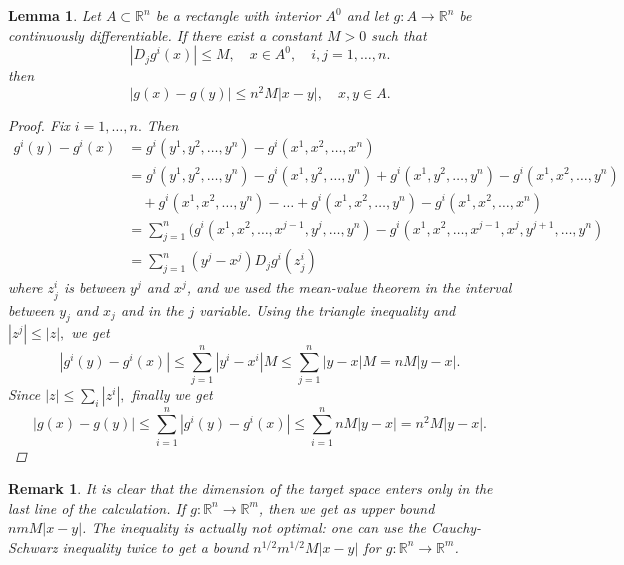 \documentclass[11pt]{article}
\def\RR{\mathbb{R}}
\newtheorem{lemma}[theorem]{Lemma}
\newtheorem*{remark}{Remark}
\begin{document}
\begin{lemma}
Let $A \subset \RR^n$ be a rectangle with interior $A^{0}$ and let $g : A \rightarrow\RR^n$ be continuously differentiable. If there exist a constant $M > 0$ such that 
\[ |D_{j}g^{i}(x)| \leq M, \quad x \in A^{0}, \quad i,j=1, \dots , n. \]
then
\[ |g(x) - g(y)| \leq n^{2}M|x-y|, \quad x,y \in A.\]
\begin{proof}
 Fix $ i = 1, \dots , n.$ Then
\begin{align*}
g^{i}(y) - g^{i}(x) &= g^{i}(y^1 , y^2 , \dots , y^n) - g^{i}(x^1 , x^ 2 , \dots , x^n )\\
&= g^{i}(y^1 , y^2 , \dots , y^n) - g^{i}(x^1 , y^2 , \dots , y^n)  +  g^{i}(x^1 , y^2 , \dots , y^n)  - g^{i}(x^1 , x^ 2 , \dots , y^n )\\ 
& \quad +  g^{i}(x^1 , x^ 2 , \dots , y^n ) - \dots +  g^{i}(x^1 , x^ 2 , \dots , y^n ) -  g^{i}(x^1 , x^ 2 , \dots , x^n )\\ &= \sum^{n}_{j=1}(g^{i}(x^1 , x^ 2 , \dots , x^{j-1} , y^{j}, \dots , y^n ) - g^{i}(x^1 , x^ 2 , \dots , x^{j-1} , x^{j}, y ^{j+1}, \dots , y^n ) \\
&= \sum^{n}_{j=1}(y^{j} \! -\! x^{j})D_{j}g^{i}(z^{i}_{j})
\end{align*}
where $z^{i}_{j}$ is between $y^j$ and $x^j$, and we used the mean-value theorem in the interval between
$y_j$ and $x_j$ and in the $j$ variable. Using the triangle inequality and $|z^j| \leq |z|, $ we get
\[ |g^{i}(y) - g^{i}(x)| \leq \sum^{n}_{j=1}|y^{i} - x^{i}|M \leq \sum^{n}_{j=1}|y - x|M = nM|y-x|.\]
Since $|z| \leq \sum_{i}|z^i |, $ finally we get
 \[ |g(x) - g(y)| \leq \sum^{n}_{i=1}|g^{i}(y) - g^{i}(x)| \leq  \sum^{n}_{i=1} nM|y-x| =  n^{2}M|y-x|. \]
\end{proof}
\end{lemma}
\begin{remark}
 It is clear that the dimension of the target space enters only in the last line of
the calculation. If $g : \RR^n \rightarrow \RR^m$, then we get as upper bound $nmM|x- y|$. The inequality
is actually not optimal: one can use the Cauchy-Schwarz inequality twice to get a bound
$n^{1/2}m^{1/2}M|x-y|$ for $g:\RR^n \rightarrow \RR^m$.
\end{remark}

\setcounter{equation}{0}
\end{document}
